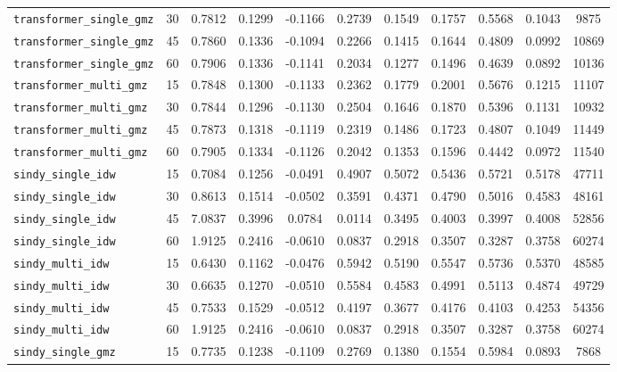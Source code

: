 \documentclass[12pt, a4paper]{article}
\begin{document}
{\begin{longtable}{p{4.0cm}cccccccccc}
\texttt{transformer\_single\_gmz} & 30 & 0.7812 & 0.1299 & -0.1166 & 0.2739 & 0.1549 & 0.1757 & 0.5568 & 0.1043 & 9875 \\
\texttt{transformer\_single\_gmz} & 45 & 0.7860 & 0.1336 & -0.1094 & 0.2266 & 0.1415 & 0.1644 & 0.4809 & 0.0992 & 10869 \\
\texttt{transformer\_single\_gmz} & 60 & 0.7906 & 0.1336 & -0.1141 & 0.2034 & 0.1277 & 0.1496 & 0.4639 & 0.0892 & 10136 \\
\addlinespace[1pt]
\texttt{transformer\_multi\_gmz} & 15 & 0.7848 & 0.1300 & -0.1133 & 0.2362 & 0.1779 & 0.2001 & 0.5676 & 0.1215 & 11107 \\
\texttt{transformer\_multi\_gmz} & 30 & 0.7844 & 0.1296 & -0.1130 & 0.2504 & 0.1646 & 0.1870 & 0.5396 & 0.1131 & 10932 \\
\texttt{transformer\_multi\_gmz} & 45 & 0.7873 & 0.1318 & -0.1119 & 0.2319 & 0.1486 & 0.1723 & 0.4807 & 0.1049 & 11449 \\
\texttt{transformer\_multi\_gmz} & 60 & 0.7905 & 0.1334 & -0.1126 & 0.2042 & 0.1353 & 0.1596 & 0.4442 & 0.0972 & 11540 \\
\addlinespace[1pt]
\texttt{sindy\_single\_idw} & 15 & 0.7084 & 0.1256 & -0.0491 & 0.4907 & 0.5072 & 0.5436 & 0.5721 & 0.5178 & 47711 \\
\texttt{sindy\_single\_idw} & 30 & 0.8613 & 0.1514 & -0.0502 & 0.3591 & 0.4371 & 0.4790 & 0.5016 & 0.4583 & 48161 \\
\texttt{sindy\_single\_idw} & 45 & 7.0837 & 0.3996 & 0.0784 & 0.0114 & 0.3495 & 0.4003 & 0.3997 & 0.4008 & 52856 \\
\texttt{sindy\_single\_idw} & 60 & 1.9125 & 0.2416 & -0.0610 & 0.0837 & 0.2918 & 0.3507 & 0.3287 & 0.3758 & 60274 \\
\addlinespace[1pt]
\texttt{sindy\_multi\_idw} & 15 & 0.6430 & 0.1162 & -0.0476 & 0.5942 & 0.5190 & 0.5547 & 0.5736 & 0.5370 & 48585 \\
\texttt{sindy\_multi\_idw} & 30 & 0.6635 & 0.1270 & -0.0510 & 0.5584 & 0.4583 & 0.4991 & 0.5113 & 0.4874 & 49729 \\
\texttt{sindy\_multi\_idw} & 45 & 0.7533 & 0.1529 & -0.0512 & 0.4197 & 0.3677 & 0.4176 & 0.4103 & 0.4253 & 54356 \\
\texttt{sindy\_multi\_idw} & 60 & 1.9125 & 0.2416 & -0.0610 & 0.0837 & 0.2918 & 0.3507 & 0.3287 & 0.3758 & 60274 \\
\addlinespace[1pt]
\texttt{sindy\_single\_gmz} & 15 & 0.7735 & 0.1238 & -0.1109 & 0.2769 & 0.1380 & 0.1554 & 0.5984 & 0.0893 & 7868 \\

\end{longtable}}
\end{document}
